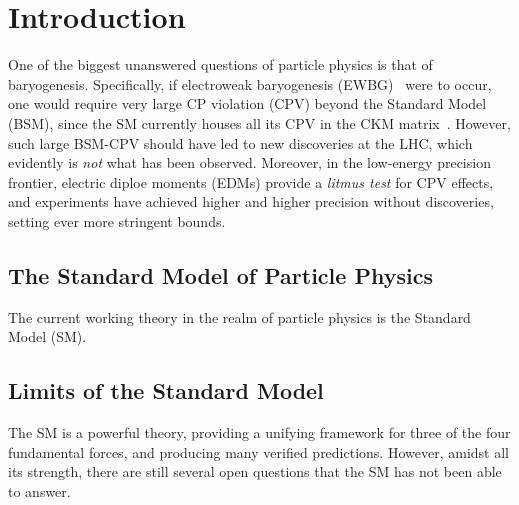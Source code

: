 \chapter{Introduction}
\label{ch:intro}

One of the biggest unanswered questions of particle physics is that of baryogenesis.
Specifically, if electroweak baryogenesis (EWBG)~\cite{EWBG} were to occur, one would require very large CP violation (CPV) beyond the Standard Model (BSM), since the SM currently houses all its CPV in the CKM matrix~\cite{PDG}.
However, such large BSM-CPV should have led to new discoveries at the LHC, which evidently is \textit{not} what has been observed.
Moreover, in the low-energy precision frontier, electric diploe moments (EDMs) provide a \textit{litmus test} for CPV effects, and experiments have achieved higher and higher precision without discoveries, setting ever more stringent bounds.

\section{The Standard Model of Particle Physics}
The current working theory in the realm of particle physics is the Standard Model (SM).

\section{Limits of the Standard Model}
The SM is a powerful theory, providing a unifying framework for three of the four fundamental forces, and producing many verified predictions.
However, amidst all its strength, there are still several open questions that the SM has not been able to answer.
